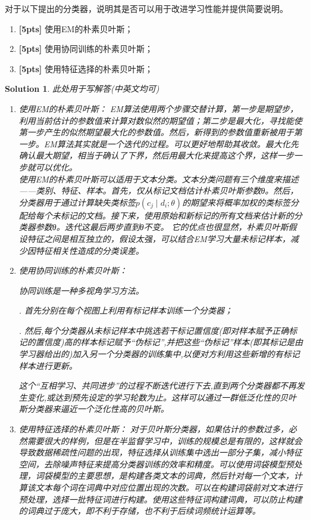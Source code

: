 \documentclass[a4paper,UTF8]{article}
\numberwithin{equation}{section}
\newtheorem*{solution}{Solution}
\begin{document}
	对于以下提出的分类器，说明其是否可以用于改进学习性能并提供简要说明。
	\begin{enumerate}
		\item \textbf{[5pts]} 使用EM的朴素贝叶斯；
		\item \textbf{[5pts]} 使用协同训练的朴素贝叶斯；
		\item \textbf{[5pts]} 使用特征选择的朴素贝叶斯；
	\end{enumerate}
	
	\begin{solution}
		此处用于写解答(中英文均可)
		
		\begin{enumerate}
			\item  使用EM的朴素贝叶斯：
			\subitem EM算法使用两个步骤交替计算，第一步是期望步，利用当前估计的参数值来计算对数似然的期望值；第二步是最大化，寻找能使第一步产生的似然期望最大化的参数值。然后，新得到的参数值重新被用于第一步。EM算法其实就是一个迭代的过程。可以更好地帮助其收敛。最大化先确认最大期望，相当于确认了下界，然后用最大化来提高这个界，这样一步一步就可以优化。\\
			使用EM的朴素贝叶斯可以适用于文本分类。文本分类问题有三个维度来描述——类别、特征、样本。首先，仅从标记文档估计朴素贝叶斯参数θ。然后，分类器用于通过计算缺失类标签$p(c_j \mid d_i;\theta)$的期望来将概率加权的类标签分配给每个未标记的文档。接下来，使用原始和新标记的所有文档来估计新的分类器参数θ。迭代这最后两步直到θ不变。
			\subitem 它的优点也很显然，朴素贝叶斯假设特征之间是相互独立的，假设太强，可以结合EM学习大量未标记样本，减少因特征相关性造成的分类误差。
			
			
			\item 使用协同训练的朴素贝叶斯：
			
			\subitem 协同训练是一种多视角学习方法。
			
			. 首先分别在每个视图上利用有标记样本训练一个分类器；
			
			. 然后,每个分类器从未标记样本中挑选若干标记置信度(即对样本赋予正确标记的置信度)高的样本标记赋予“伪标记”,并把这些“伪标记”样本(即其标记是由学习器给出的)加入另一个分类器的训练集中,以便对方利用这些新增的有标记样本进行更新。
	
			\subitem 这个“互相学习、共同进步”的过程不断迭代进行下去,直到两个分类器都不再发生变化,或达到预先设定的学习轮数为止。这样可以通过一群低泛化性的贝叶斯分类器来逼近一个泛化性高的贝叶斯。
			

			\item 使用特征选择的朴素贝叶斯：
			\subitem 对于贝叶斯分类器，如果估计的参数过多，必然需要很大的样例，但是在半监督学习中，训练的规模总是有限的，这样就会导致数据稀疏性问题的出现，特征选择从训练集中选出一部分子集，减小特征空间，去除噪声特征来提高分类器训练的效率和精度。可以使用词袋模型预处理，词袋模型的主要思想，是构建各类文本的词典，然后针对每一个文本，计算该文本每个词在词典中对应位置出现的次数。可以在构建词袋前对文本进行预处理，选择一批特征词进行构建。使用这些特征词构建词典，可以防止构建的词典过于庞大，即不利于存储，也不利于后续词频统计运算等。
		\end{enumerate}
	\end{solution}
	\newpage
	
\end{document}

